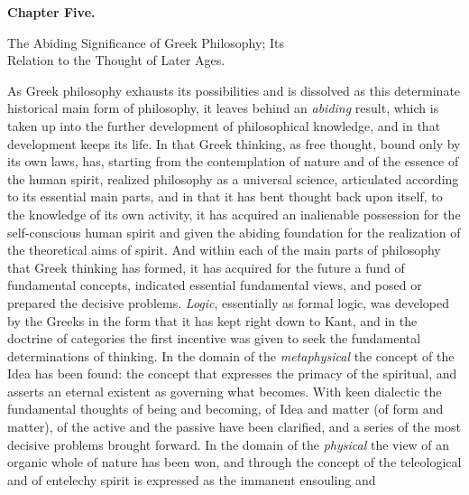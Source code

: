 \divrule

\begin{center}
{\Large\textbf{Chapter Five.}}
\end{center}

\divrule

\begin{center}
{\Large The Abiding Significance of Greek Philosophy; Its\\
Relation to the Thought of Later Ages.}
\end{center}

\divrule

As Greek philosophy exhausts its possibilities and is dissolved as this
determinate historical main form of philosophy, it leaves behind an
\emph{abiding} result, which is taken up into the further development of
philosophical knowledge, and in that development keeps its life. In
that Greek thinking, as free thought, bound only by its own laws, has,
starting from the contemplation of nature and of the essence of the
human spirit, realized philosophy as a universal science, articulated
according to its essential main parts, and in that it has bent thought
back upon itself, to the knowledge of its own activity, it has acquired
an inalienable possession for the self-conscious human spirit and given
the abiding foundation for the realization of the theoretical aims of
spirit. And within each of the main parts of philosophy that Greek
thinking has formed, it has acquired for the future a fund of
fundamental concepts, indicated essential fundamental views, and posed
or prepared the decisive problems. \emph{Logic}, essentially as formal
logic, was developed by the Greeks in the form that it has kept right
down to Kant, and in the doctrine of categories the first incentive was
given to seek the fundamental determinations of thinking. In the domain
of the \emph{metaphysical} the concept of the Idea has been found: the
concept that expresses the primacy of the spiritual, and asserts an
eternal existent as governing what becomes. With keen dialectic the
fundamental thoughts of being and becoming, of Idea and matter (of form
and matter), of the active and the passive have been clarified, and a
series of the most decisive problems brought forward. In the domain of
the \emph{physical} the view of an organic whole of nature has been won,
and through the concept of the teleological and
of entelechy spirit is expressed as the immanent ensouling and
